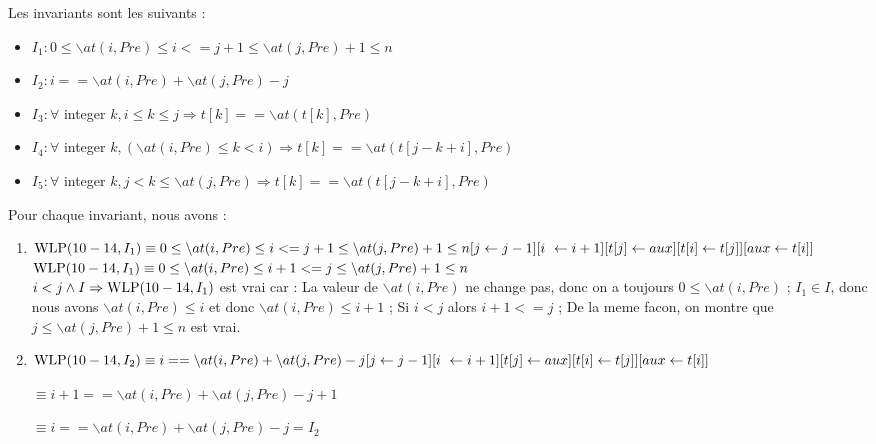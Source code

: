 \documentclass[11pt,answers]{exam}
\begin{document}
\begin{questions}
\begin{parts}
\begin{solutionorbox}
            Les invariants sont les suivants :
            \begin{itemize} 
                \item $I_1 : 0 \leq \backslash at(i, Pre) \leq i <= j+1 \leq \backslash at(j, Pre) + 1 \leq n$
                \item $I_2 : i == \backslash at(i, Pre) + \backslash at(j, Pre) - j$
                \item $I_3 : \forall$ integer $k, i \leq k \leq j \Rightarrow t[k] == \backslash at(t[k], Pre)$
                \item $I_4 : \forall$ integer $k, (\backslash at(i, Pre) \leq k < i) \Rightarrow t[k] == \backslash at(t[j - k + i], Pre)$
                \item $I_5 : \forall$ integer $k, j < k \leq \backslash at(j, Pre) \Rightarrow t[k] == \backslash at(t[j - k + i], Pre)$ \\
            \end{itemize}

            Pour chaque invariant, nous avons :
            \begin{enumerate}
                \item $\mathrm{WLP}(10-14,I_1) \equiv 0 \leq \backslash at(i, Pre) \leq i <= j + 1 \leq \backslash at(j, Pre) + 1 \leq n [j \leftarrow j - 1][i \ \leftarrow i + 1][t[j] \leftarrow aux][t[i] \leftarrow t[j]][aux \leftarrow t[i]]$
                      $\mathrm{WLP}(10-14, I_1) \equiv  0 \leq \backslash at(i, Pre) \leq i + 1 <= j \leq \backslash at(j, Pre) + 1 \leq n $\\
    
                      $i < j \land I \Rightarrow \mathrm{WLP}(10-1 4,I_1)$ est vrai car : La valeur de $\backslash at(i, Pre)$ ne change pas, donc on a toujours $0 \leq \backslash at(i, Pre)$ ; $I_1 \in I$, donc nous avons $\backslash at(i, Pre) \leq i$ et donc $\backslash at(i, Pre) \leq i+1$ ; Si $i < j$ alors $i+1<=j$ ; De la meme facon, on montre que $j \leq \backslash at(j, Pre)+1 \leq n $ est vrai.
                \item $\WLP(10-14,I_2) \equiv i == \backslash at(i, Pre)  + \backslash at(j, Pre ) - j [j \leftarrow j-1][i \ \leftarrow i+1][t[j] \leftarrow aux][t[i] \leftarrow t[j]][aux \leftarrow t[i]]$
    
                    \hspace*{3cm}$\equiv i+1 == \backslash at(i, Pre) + \backslash at(j, Pre ) - j + 1 $
    
                    \hspace*{3cm}$\equiv i == \backslash at(i, Pre)  + \backslash at(j, Pre ) - j = I_2$\\
    

\end{enumerate}
\end{solutionorbox}
\end{parts}
\end{questions}
\end{document}
